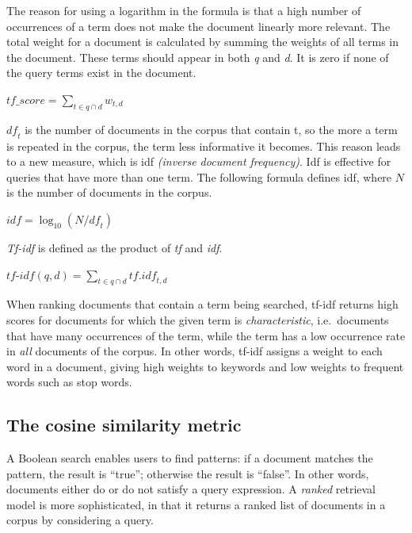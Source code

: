 \documentclass{IOS-Book-Article}
\begin{document}
The reason for using a logarithm in the formula is that a high number of occurrences of a term does not make the document linearly more relevant.
The total weight for a document is calculated by summing the weights of all terms in the document.
These terms should appear in both \textit{q} and \textit{d}.
It is zero if none of the query terms exist in the document.

\begin{center}
	$\mathit{tf\_score}=\sum_{t\in q\cap d} w_{t,d}$
\end{center}

$\mathit{df}_t$ is the number of documents in the corpus that contain t, so the more a term is repeated in the corpus, the term less informative it becomes.
This reason leads to a new measure, which is idf \emph{(inverse document frequency)}.
Idf is effective for queries that have more than one term.
The following formula defines idf, where $N$ is the number of documents in the corpus.

\begin{center} 
	$\mathit{idf}=\log_{10} (N/\mathit{df}_t)$
\end{center}

\emph{Tf-idf} is defined as the product of \emph{tf} and \emph{idf}. 

\begin{center}
	$\textit{tf-idf}(q,d)=\sum_{t\in q\cap d} \mathit{tf}.\mathit{idf}_{t,d}$
\end{center}

When ranking documents that contain a term being searched, tf-idf returns high scores for documents for which the given term is \emph{characteristic}, i.e.\ documents that have many occurrences of the term, while the term has a low occurrence rate in \emph{all} documents of the corpus.
In other words, tf-idf assigns a weight to each word in a document, giving high weights to keywords and low weights to frequent words such as stop words.

\subsection{The cosine similarity metric}
\label{sec:cosine}
A Boolean search enables users to find patterns: if a document matches the pattern, the result is “true”; otherwise the result is “false”.
In other words, documents either do or do not satisfy a query expression.
A \emph{ranked} retrieval model is more sophisticated, in that it returns a ranked list of documents in a corpus by considering a query. 
\end{document}
